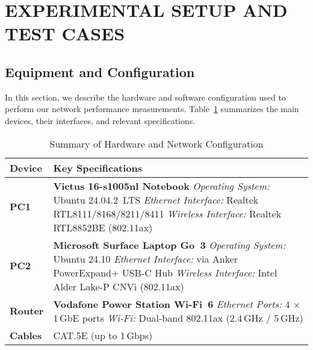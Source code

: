 
\section{EXPERIMENTAL SETUP AND TEST CASES} \label{sec:experimental-setup-and-test-cases}

\subsection{Equipment and Configuration} \label{subsec:equipment-and-configuration}

In this section, we describe the hardware and software configuration used to perform our network performance measurements. Table~\ref{tab:equipment-summary} summarizes the main devices, their interfaces, and relevant specifications. 

\begin{table}[ht]
    \small
    \centering
    \begin{tabular}{@{}l p{}@{}}
    \toprule
    \textbf{Device} & \textbf{Key Specifications} \\
    \midrule
    \textbf{PC1} 
        & \textbf{Victus 16-s1005nl Notebook} \newline
          \textit{Operating System:} Ubuntu 24.04.2~LTS \newline
          \textit{Ethernet Interface:} Realtek RTL8111/8168/8211/8411 \newline
          \textit{Wireless Interface:} Realtek RTL8852BE (802.11ax) \\
    \midrule
    \textbf{PC2} 
        & \textbf{Microsoft Surface Laptop Go~3} \newline
          \textit{Operating System:} Ubuntu 24.10 \newline
          \textit{Ethernet Interface:} via Anker PowerExpand+ USB-C Hub \newline
          \textit{Wireless Interface:} Intel Alder Lake-P CNVi (802.11ax) \\
    \midrule
    \textbf{Router} 
        & \textbf{Vodafone Power Station Wi-Fi~6} \newline
          \textit{Ethernet Ports:} 4 $\times$ 1\,GbE ports \newline
          \textit{Wi-Fi:} Dual-band 802.11ax (2.4\,GHz / 5\,GHz) \\
    \midrule
    \textbf{Cables} 
        & CAT.5E (up to 1\,Gbps) \\
    \bottomrule
    \end{tabular}
    \vspace{0.5cm}
    \caption{Summary of Hardware and Network Configuration}
    \label{tab:equipment-summary}
\end{table}

